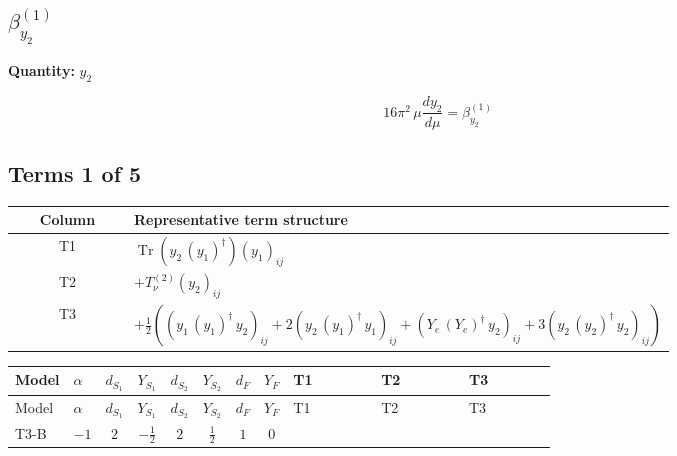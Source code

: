 \documentclass[8pt]{article}
\begin{document}
\begin{landscape}
\section*{$\beta_{y_2}^{(1)}$}
\noindent\textbf{Quantity: }$y_2$\par\smallskip
\[16\pi^2\,\mu\frac{d y_2}{d\mu}=\beta_{y_2}^{(1)}\]
\subsection*{Terms 1 of 5}
\begin{center}
\begin{tabular}{@{}c >{\raggedright\arraybackslash}p{0.82\linewidth}@{}}
\toprule
Column & Representative term structure \\
\midrule
T1 & \(\displaystyle \operatorname{Tr}\!\left({y_2}\,\left({y_1}\right)^{\dagger}\right) \left({y_1}\right)_{ij}\) \\
\midrule
T2 & \(\displaystyle +T_{\nu}^{(2)} \left({y_2}\right)_{ij}\) \\
\midrule
T3 & \(\displaystyle +\frac{1}{2} (\left({y_1}\,\left({y_1}\right)^{\dagger}\,{y_2}\right)_{ij}+2 \left({y_2}\,\left({y_1}\right)^{\dagger}\,{y_1}\right)_{ij}+\left({Y_e}\,\left({Y_e}\right)^{\dagger}\,{y_2}\right)_{ij}+3 \left({y_2}\,\left({y_2}\right)^{\dagger}\,{y_2}\right)_{ij})\) \\
\midrule
\bottomrule
\end{tabular}
\end{center}
\smallskip
\tiny
\begin{longtable}{@{}llcccccc >{\raggedright\arraybackslash}p{0.21\linewidth} >{\raggedright\arraybackslash}p{0.21\linewidth} >{\raggedright\arraybackslash}p{0.21\linewidth}@{}}
\toprule
Model & $\alpha$ & $d_{S_1}$ & $Y_{S_1}$ & $d_{S_2}$ & $Y_{S_2}$ & $d_F$ & $Y_F$ & T1 & T2 & T3 \\
\midrule
\endfirsthead
\toprule
Model & $\alpha$ & $d_{S_1}$ & $Y_{S_1}$ & $d_{S_2}$ & $Y_{S_2}$ & $d_F$ & $Y_F$ & T1 & T2 & T3 \\
\midrule
\endhead
T3-B & $-1$ & $2$ & $-\frac{1}{2}$ & $2$ & $\frac{1}{2}$ & $1$ & $0$ & \scriptsize\adjustbox{max width=\linewidth}{$\begin{gathered} \operatorname{Tr}\!\left({y_2}\,\left({y_1}\right)^{\dagger}\right) \left({y_1}\right)_{ij}\end{gathered}$} & \scriptsize\adjustbox{max width=\linewidth}{$\begin{gathered} +T_{\nu}^{(2)} \left({y_2}\right)_{ij}\end{gathered}$} & \scriptsize\adjustbox{max width=\linewidth}{$\begin{gathered} +\frac{1}{2} (\left({y_1}\,\left({y_1}\right)^{\dagger}\,{y_2}\right)_{ij}+2 \left({y_2}\,\left({y_1}\right)^{\dagger}\,{y_1}\right)_{ij}+\left({Y_e}\,\left({Y_e}\right)^{\dagger}\,{y_2}\right)_{ij}+3 \left({y_2}\,\left({y_2}\right)^{\dagger}\,{y_2}\right)_{ij})\end{gathered}$} \\

\end{longtable}
\end{landscape}
\end{document}
